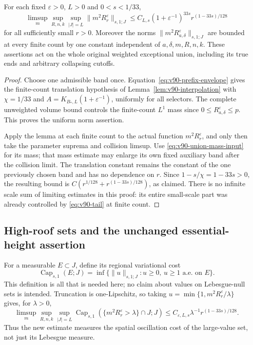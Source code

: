 \begin{theorem}
\label{thm:v90-original-variation}
For each fixed $\varepsilon>0$, $L>0$ and $0<s<1/33$,
\begin{equation}\label{eq:v90-original-variation}
 \limsup_m\sup_{R,n,k}\sup_{|J|=L}
       \|m^2R_r^\varepsilon\|_{s,1;J}
          \le C_{L,s}(1+\varepsilon^{-1})^{33s}r^{(1-33s)/128}
\end{equation}
for all sufficiently small $r>0$. Moreover the norms
$\|m^2R_{a,\delta}^\varepsilon\|_{s,1;J}$ are bounded at every
finite count by one constant independent of $a,\delta,m,R,n,k$.
These assertions act on the whole original weighted exceptional
union, including its true ends and arbitrary collapsing cutoffs.
\end{theorem}
\begin{proof}
Choose one admissible band once. Equation~\eqref{eq:v90-prefix-envelope}
gives the finite-count translation hypothesis of
Lemma~\ref{lem:v90-interpolation} with $\chi=1/33$ and
$A=K_{B_*,L}(1+\varepsilon^{-1})$, uniformly for all selectors.
The complete unweighted volume bound controls the finite-count
$L^1$ mass since $0\le R_{a,\delta}^\varepsilon\le p$.
This proves the uniform norm assertion.

Apply the lemma at each finite count to the actual function
$m^2R_r^\varepsilon$, and only then take the parameter suprema and
collision limsup. Use \eqref{eq:v90-union-mass-input} for its mass;
that mass estimate may enlarge its own fixed auxiliary band after
the collision limit. The translation constant remains the constant
of the one previously chosen band and has no dependence on $r$.
Since $1-s/\chi=1-33s>0$, the resulting bound is
$C(r^{1/128}+r^{(1-33s)/128})$, as claimed. There is no infinite
scale sum of limiting estimates in this proof: its entire small-scale
part was already controlled by \eqref{eq:v90-tail} at finite count.
\end{proof}

\subsection{High-roof sets and the unchanged essential-height assertion}
For a measurable $E\subset J$, define its regional variational cost
\[
 \operatorname{Cap}_{s,1}(E;J)=
 \inf\{\|u\|_{s,1;J}:u\ge0,\ u\ge1\text{ a.e. on }E\}.
\]
This definition is all that is needed here; no claim about values on
Lebesgue-null sets is intended. Truncation is one-Lipschitz, so taking
$u=\min\{1,m^2R_r^\varepsilon/\lambda\}$ gives, for $\lambda>0$,
\begin{equation}\label{eq:v90-capacity}
 \limsup_m\sup_{R,n,k}\sup_{|J|=L}
 \operatorname{Cap}_{s,1}
       (\{m^2R_r^\varepsilon>\lambda\}\cap J;J)
 \le C_{\varepsilon,L,s}\lambda^{-1}r^{(1-33s)/128}.
\end{equation}
Thus the new estimate measures the spatial oscillation cost of the
large-value set, not just its Lebesgue measure.

